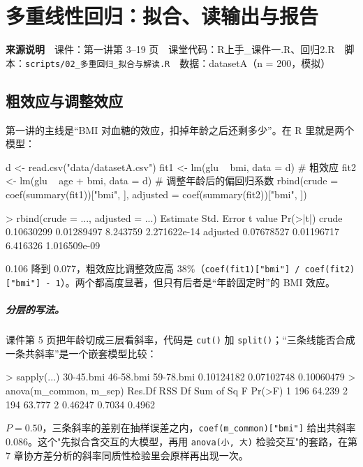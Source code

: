 \chapter{多重线性回归：拟合、读输出与报告}

\begin{studysource}
\textbf{来源说明}　课件：第一讲第 3–19 页　课堂代码：R上手\_课件一.R、回归2.R　脚本：\texttt{scripts/02\_多重回归\_拟合与解读.R}　数据：datasetA（n = 200，模拟）
\end{studysource}


\section{粗效应与调整效应}
第一讲的主线是“BMI 对血糖的效应，扣掉年龄之后还剩多少”。在 R 里就是两个模型：

\begin{rcode}[R · 两个模型]
d <- read.csv("data/datasetA.csv")
fit1 <- lm(glu ~ bmi, data = d)          # 粗效应
fit2 <- lm(glu ~ age + bmi, data = d)    # 调整年龄后的偏回归系数
rbind(crude    = coef(summary(fit1))["bmi", ],
      adjusted = coef(summary(fit2))["bmi", ])
\end{rcode}
\begin{routput}
> rbind(crude = ..., adjusted = ...)
           Estimate Std. Error  t value     Pr(>|t|)
crude    0.10630299 0.01289497 8.243759 2.271622e-14
adjusted 0.07678527 0.01196717 6.416326 1.016509e-09
\end{routput}
0.106 降到 0.077，粗效应比调整效应高 38\%（\Verb|coef(fit1)["bmi"] / coef(fit2)["bmi"] - 1|）。两个都高度显著，但只有后者是“年龄固定时”的 BMI 效应。

\paragraph{分层的写法。}课件第 5 页把年龄切成三层看斜率，代码是 \Verb|cut()| 加 \Verb|split()|；“三条线能否合成一条共斜率”是一个嵌套模型比较：

\begin{routput}
> sapply(...)
 30-45.bmi  46-58.bmi  59-78.bmi
0.10124182 0.07102748 0.10060479
> anova(m_common, m_sep)
  Res.Df    RSS Df Sum of Sq      F Pr(>F)
1    196 64.239
2    194 63.777  2   0.46247 0.7034 0.4962
\end{routput}
$P = 0.50$，三条斜率的差别在抽样误差之内，\Verb|coef(m_common)["bmi"]| 给出共斜率 0.086。这个"先拟合含交互的大模型，再用 \Verb|anova(小, 大)| 检验交互"的套路，在第 7 章协方差分析的斜率同质性检验里会原样再出现一次。

